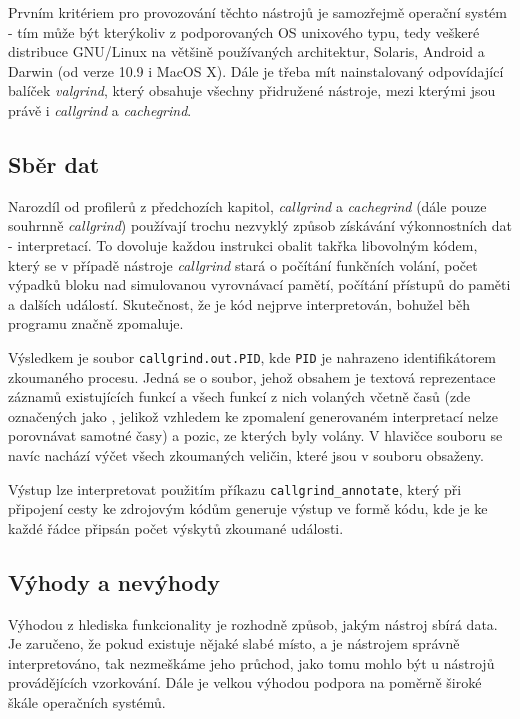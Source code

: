 \documentclass[czech,BP]{thesiskiv}
\begin{document}
Prvním kritériem pro provozování těchto nástrojů je samozřejmě operační systém - tím může být kterýkoliv z podporovaných OS unixového typu, tedy veškeré distribuce GNU/Linux na většině používaných architektur, Solaris, Android a Darwin (od verze 10.9 i MacOS X)\cite{grind1}. Dále je třeba mít nainstalovaný odpovídající balíček \emph{valgrind}, který obsahuje všechny přidružené nástroje, mezi kterými jsou právě i \emph{callgrind} a \emph{cachegrind}.

\subsection*{Sběr dat}

Narozdíl od profilerů z předchozích kapitol, \emph{callgrind} a \emph{cachegrind} (dále pouze souhrnně \emph{callgrind}) používají trochu nezvyklý způsob získávání výkonnostních dat - interpretací. To dovoluje každou instrukci obalit takřka libovolným kódem, který se v případě nástroje \emph{callgrind} stará o počítání funkčních volání, počet výpadků bloku nad simulovanou vyrovnávací pamětí, počítání přístupů do paměti a dalších událostí. Skutečnost, že je kód nejprve interpretován, bohužel běh programu značně zpomaluje.

Výsledkem je soubor \texttt{callgrind.out.PID}, kde \texttt{PID} je nahrazeno identifikátorem zkoumaného procesu. Jedná se o soubor, jehož obsahem je textová reprezentace záznamů existujících funkcí a všech funkcí z nich volaných včetně časů (zde označených jako , jelikož vzhledem ke zpomalení generovaném interpretací nelze porovnávat samotné časy) a pozic, ze kterých byly volány. V hlavičce souboru se navíc nachází výčet všech zkoumaných veličin, které jsou v souboru obsaženy\cite{grind3}.

Výstup lze interpretovat použitím příkazu \texttt{callgrind\_annotate}, který při připojení cesty ke zdrojovým kódům generuje výstup ve formě kódu, kde je ke každé řádce připsán počet výskytů zkoumané události.

\subsection*{Výhody a nevýhody}

Výhodou z hlediska funkcionality je rozhodně způsob, jakým nástroj sbírá data. Je zaručeno, že pokud existuje nějaké slabé místo, a je nástrojem správně interpretováno, tak nezmeškáme jeho průchod, jako tomu mohlo být u nástrojů provádějících vzorkování. Dále je velkou výhodou podpora na poměrně široké škále operačních systémů.
\end{document}
